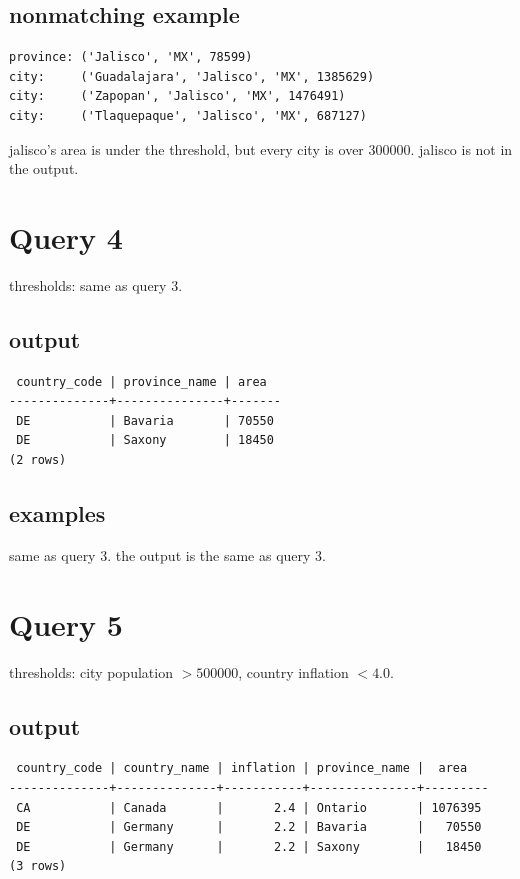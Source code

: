 \documentclass[11pt]{article}
\begin{document}
\subsection*{nonmatching example}
\begin{verbatim}
province: ('Jalisco', 'MX', 78599)
city:     ('Guadalajara', 'Jalisco', 'MX', 1385629)
city:     ('Zapopan', 'Jalisco', 'MX', 1476491)
city:     ('Tlaquepaque', 'Jalisco', 'MX', 687127)
\end{verbatim}
jalisco's area is under the threshold, but every city is over 300000. jalisco is not in the output.

\section*{Query 4}

thresholds: same as query 3.

\subsection*{output}
{\small
\begin{verbatim}
 country_code | province_name | area
--------------+---------------+-------
 DE           | Bavaria       | 70550
 DE           | Saxony        | 18450
(2 rows)
\end{verbatim}
}

\subsection*{examples}
same as query 3. the output is the same as query 3.

\section*{Query 5}

thresholds: city population $> 500000$, country inflation $< 4.0$.

\subsection*{output}
{\small
\begin{verbatim}
 country_code | country_name | inflation | province_name |  area
--------------+--------------+-----------+---------------+---------
 CA           | Canada       |       2.4 | Ontario       | 1076395
 DE           | Germany      |       2.2 | Bavaria       |   70550
 DE           | Germany      |       2.2 | Saxony        |   18450
(3 rows)
\end{verbatim}
}
\end{document}
